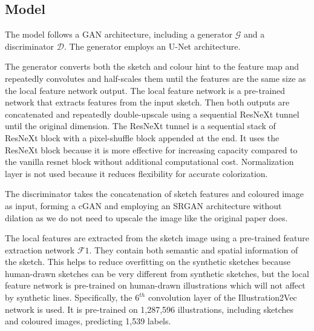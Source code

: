 \subsection{Model}


The model follows a GAN architecture, including a generator $\mathcal{G}$ and a discriminator $\mathcal{D}$. The generator employs an U-Net\cite{ronnebergerUNetConvolutionalNetworks2015} architecture.

The generator converts both the sketch and colour hint to the feature map and repeatedly convolutes and half-scales them until the features are the same size as the local feature network output. The local feature network is a pre-trained network that extracts features from the input sketch. Then both outputs are concatenated and repeatedly double-upscale using a sequential ResNeXt tunnel until the original dimension. The ResNeXt tunnel is a sequential stack of ResNeXt block\cite{xieAggregatedResidualTransformations2017a} with a pixel-shuffle block\cite{shiRealTimeSingleImage2016} appended at the end. It uses the ResNeXt block because it is more effective for increasing capacity compared to the vanilla resnet block without additional computational cost. Normalization layer is not used because it reduces flexibility for accurate colorization\cite{nahDeepMultiscaleConvolutional2018}.

The discriminator takes the concatenation of sketch features and coloured image as input, forming a cGAN\cite{mirzaConditionalGenerativeAdversarial2014} and employing an SRGAN\cite{ledigPhotoRealisticSingleImage2017} architecture without dilation as we do not need to upscale the image like the original paper does.

The local features are extracted from the sketch image using a pre-trained feature extraction network $\mathcal{F}1$. They contain both semantic and spatial information of the sketch. This helps to reduce overfitting on the synthetic sketches because human-drawn sketches can be very different from synthetic sketches, but the local feature network is pre-trained on human-drawn illustrations which will not affect by synthetic lines. Specifically, the $6^{th}$ convolution layer of the Illustration2Vec\cite{saitoIllustration2VecSemanticVector2015} network is used. It is pre-trained on 1,287,596 illustrations, including sketches and coloured images, predicting 1,539 labels.

